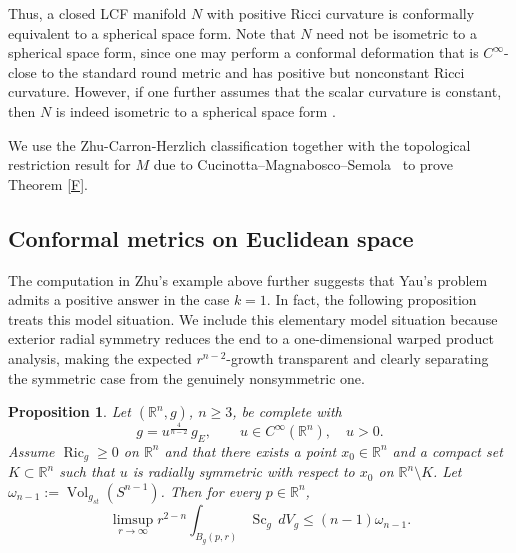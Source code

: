 \documentclass[12pt,oneside,a4paper]{article}
\newtheorem{proposition}[definition]{Proposition}
\theoremstyle{mytheorem}
\theoremstyle{remark}
\begin{document}
Thus, a closed LCF manifold \(N\) with positive Ricci curvature is conformally equivalent to a spherical space form. Note that \(N\) need not be isometric to a spherical space form, since one may perform a conformal deformation that is \(C^{\infty}\)-close to the standard round metric and has positive but nonconstant Ricci curvature.
 However, if one further assumes that the scalar curvature is constant, then \(N\) is indeed isometric to a spherical space form \cite{MR220213}.
 
 

We use the Zhu-Carron-Herzlich classification together with the topological restriction result for \(M\) due to Cucinotta--Magnabosco--Semola~\cite{2026arXiv260114231C} to prove   Theorem \ref{F}.

\subsection{Conformal metrics on Euclidean space}
The computation in Zhu's example above further suggests that Yau's problem admits a positive answer in the case \(k=1\). In fact, the following proposition treats this model situation. We include this elementary model situation because exterior radial symmetry reduces the end to a one-dimensional warped product analysis, making the expected $r^{n-2}$-growth transparent and clearly separating the symmetric case from the genuinely nonsymmetric one.

\begin{proposition}\label{global conformal to flat}
Let $(\mathbb{R}^n,g)$, $n\ge 3$, be complete with
\[
 g=u^{\frac{4}{n-2}}\,g_E,
 \qquad
 u\in C^\infty(\mathbb R^n),\quad u>0.
\]
Assume $\operatorname{Ric}_g\ge 0$ on $\mathbb R^n$ and that there exists a point
$x_0\in\mathbb R^n$ and a compact set $K\subset \mathbb R^n$ such that $u$ is
radially symmetric with respect to $x_0$ on $\mathbb R^n\setminus K$.
Let $\omega_{n-1}:=\operatorname{Vol}_{g_{st}}(S^{n-1})$. Then for every $p\in\mathbb R^n$,
\[
\limsup_{r\to\infty} r^{2-n}\int_{B_g(p,r)} \operatorname{Sc}_g\,dV_g
\le (n-1)\omega_{n-1}.
\]
\end{proposition}
\end{document}
